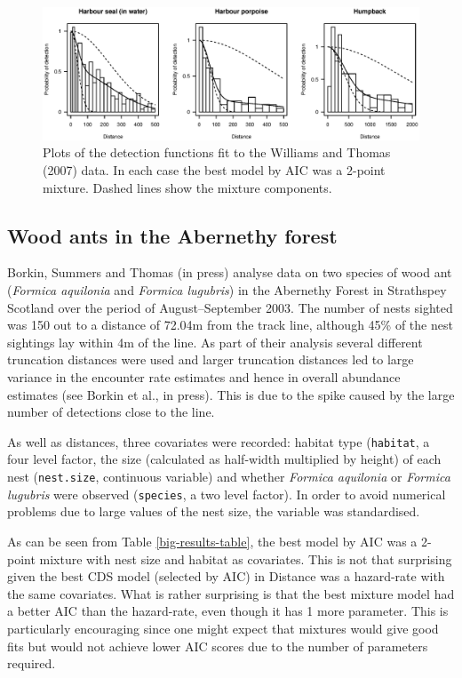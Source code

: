 \documentclass[useAMS,referee, usegraphicx]{biom}
\begin{document}
\begin{figure}
\centering
\includegraphics[width=\textwidth]{analyses/williamsplots.eps}
\caption{Plots of the detection functions fit to the Williams and Thomas (2007) data. In each case the best model by AIC was a 2-point mixture. Dashed lines show the mixture components.}
\label{williams-detfcts}
\end{figure}


\subsection{Wood ants in the Abernethy forest}

Borkin, Summers and Thomas (in press) analyse data on two species of wood ant (\textit{Formica aquilonia} and \textit{Formica lugubris}) in the Abernethy Forest in Strathspey Scotland over the period of August--September 2003. The number of nests sighted was 150 out to a distance of 72.04m from the track line, although 45\% of the nest sightings lay within 4m of the line. As part of their analysis several different truncation distances were used and larger truncation distances led to large variance in the encounter rate estimates and hence in overall abundance estimates (see Borkin et al., in press). This is due to the spike caused by the large number of detections close to the line.

As well as distances, three covariates were recorded: habitat type (\texttt{habitat}, a four level factor, the size (calculated as half-width multiplied by height) of each nest (\texttt{nest.size}, continuous variable) and whether \textit{Formica aquilonia} or \textit{Formica lugubris} were observed (\texttt{species}, a two level factor). In order to avoid numerical problems due to large values of the nest size, the variable was standardised.

As can be seen from Table \ref{big-results-table}, the best model by AIC was a 2-point mixture with nest size and habitat as covariates. This is not that surprising given the best CDS model (selected by AIC) in Distance was a hazard-rate with the same covariates. What is rather surprising is that the best mixture model had a better AIC than the hazard-rate, even though it has 1 more parameter. This is particularly encouraging since one might expect that mixtures would give good fits but would not achieve lower AIC scores due to the number of parameters required.
\end{document}

